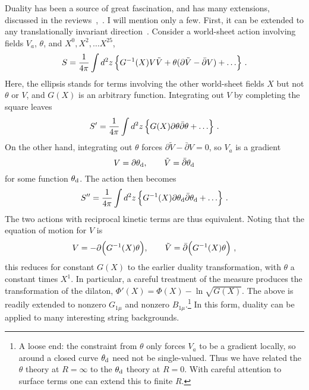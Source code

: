 
Duality has been a source of great fascination, and has many
extensions, discussed in the
reviews~\cite{GPR},~\cite{Tsdual}.  I will mention only a few. 
First, it can be extended to any translationally invariant
direction~\cite{Busch}.  Consider a world-sheet action involving
fields
$V_a$,
$\theta$, and
$X^0, X^2, \ldots X^{25}$,
\begin{equation}
S = \frac{1}{4\pi} \int d^2z\, \Bigl\{
G^{-1}(X) V \tilde V +
\theta (\partial \tilde V - \bar\partial V) 
+\ldots \Bigr\}\ . \label{step1}
\end{equation}
Here, the ellipsis stands for terms involving the other world-sheet
fields $X$ but not $\theta$ or $V$, and $G(X)$ is an arbitrary
function.  Integrating out $V$ by completing the square leaves
\begin{equation}
S' = \frac{1}{4\pi} \int d^2z \,\Bigl\{
G(X) \partial \theta \bar\partial \theta
+\ldots \Bigr\}\ .
\end{equation}
On the other hand, integrating out $\theta$
forces $\partial \tilde V - \bar\partial V = 0$, so $V_a$ is a
gradient
\begin{equation}
V = \partial \theta_{\rm d}, \qquad \tilde V = \bar\partial
\theta_{\rm d} \label{grad}
\end{equation}
for some function $\theta_{\rm d}$.  The action then becomes
\begin{equation}
S'' = \frac{1}{4\pi} \int d^2z \, \Bigl\{
G^{-1}(X) \partial \theta_{\rm d} \bar\partial \theta_{\rm d}
+\ldots \Bigr\}\ . \label{stepn}
\end{equation}
The two actions with reciprocal kinetic terms are thus equivalent.
Noting that the equation of motion for $V$ is
\begin{equation}
V = -\partial \Bigl( G^{-1}(X) \theta \Bigr), \qquad \tilde V =
\bar\partial \Bigl( G^{-1}(X) \theta \Bigr)\ ,
\end{equation}
this reduces for constant $G(X)$ to the earlier duality
transformation, with $\theta$ a constant times $X^{1}$.
In particular, a careful treatment of the measure
produces the transformation of the dilaton, $\Phi'(X) = \Phi (X) -
\ln \sqrt{G(X)}$.
The above is readily extended to nonzero $G_{1\mu}$ and
nonzero $B_{1\mu}$.\footnote{A loose end: the constraint from
$\theta$ only forces $V_a$ to be a gradient locally, so around
a closed curve $\theta_{\rm d}$ need not be single-valued.  Thus we 
have
related the $\theta$ theory at $R=\infty$ to the $\theta_{\rm d}$
theory at $R=0$.  With careful attention to surface terms one can
extend this to finite $R$.}  In this form, duality can be applied to
many interesting string backgrounds.

